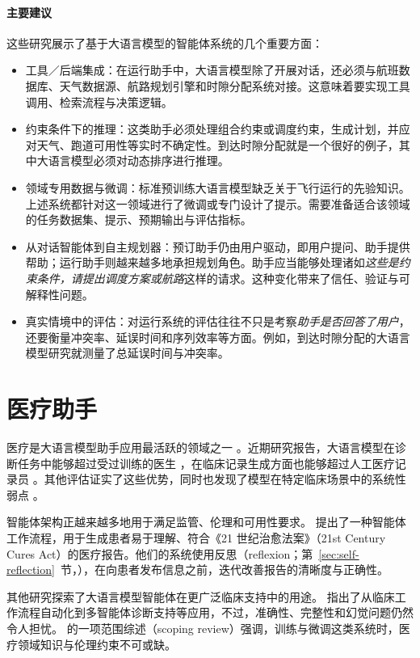 \paragraph{主要建议}
这些研究展示了基于大语言模型的智能体系统的几个重要方面：

\begin{itemize}
    \item 工具／后端集成：在运行助手中，大语言模型除了开展对话，还必须与航班数据库、天气数据源、航路规划引擎和时隙分配系统对接。这意味着要实现工具调用、检索流程与决策逻辑。
    \item 约束条件下的推理：这类助手必须处理组合约束或调度约束，生成计划，并应对天气、跑道可用性等实时不确定性。到达时隙分配就是一个很好的例子，其中大语言模型必须对动态排序进行推理。
    \item 领域专用数据与微调：标准预训练大语言模型缺乏关于飞行运行的先验知识。上述系统都针对这一领域进行了微调或专门设计了提示。需要准备适合该领域的任务数据集、提示、预期输出与评估指标。
    \item 从对话智能体到自主规划器：预订助手仍由用户驱动，即用户提问、助手提供帮助；运行助手则越来越多地承担规划角色。助手应当能够处理诸如{\em 这些是约束条件，请提出调度方案或航路}这样的请求。这种变化带来了信任、验证与可解释性问题。
    \item 真实情境中的评估：对运行系统的评估往往不只是考察{\em 助手是否回答了用户}，还要衡量冲突率、延误时间和序列效率等方面。例如，到达时隙分配的大语言模型研究就测量了总延误时间与冲突率。
\end{itemize}

\section{医疗助手}
医疗是大语言模型助手应用最活跃的领域之一 \citep{thirunavukarasu2023large,clusmann2023future,mehandru2024evaluating}。近期研究报告，大语言模型在诊断任务中能够超过受过训练的医生 \citep{goh2024large}，在临床记录生成方面也能够超过人工医疗记录员 \citep{yuan2024continued}。其他评估证实了这些优势，同时也发现了模型在特定临床场景中的系统性弱点 \citep{panagoulias2024evaluating}。

智能体架构正越来越多地用于满足监管、伦理和可用性要求。\citet{sudarshan2024agentic} 提出了一种智能体工作流程，用于生成患者易于理解、符合《21 世纪治愈法案》（21st Century Cures Act）的医疗报告。他们的系统使用反思（reflexion；第~\ref{sec:self-reflection}~节，\citep{shinn2024reflexion}），在向患者发布信息之前，迭代改善报告的清晰度与正确性。

其他研究探索了大语言模型智能体在更广泛临床支持中的用途。\citet{qiu2024llm} 指出了从临床工作流程自动化到多智能体诊断支持等应用，不过，准确性、完整性和幻觉问题仍然令人担忧。\citet{ullah2024challenges} 的一项范围综述（scoping review）强调，训练与微调这类系统时，医疗领域知识与伦理约束不可或缺。

